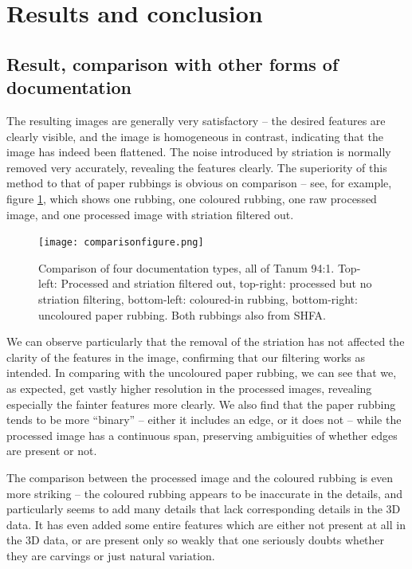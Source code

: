 \documentclass[a4paper,reqno,oneside]{amsart} %
\theoremstyle{definition}
\theoremstyle{remark}
\numberwithin{equation}{section}
\begin{document}
\section{Results and conclusion}

\subsection{Result, comparison with other forms of documentation}

The resulting images are generally very satisfactory -- the desired features are clearly visible, and the image is homogeneous in contrast, indicating that the image has indeed been flattened. The noise introduced by striation is normally removed very accurately, revealing the features clearly. The superiority of this method to that of paper rubbings is obvious on comparison -- see, for example, figure \ref{fig:comparison}, which shows one rubbing, one coloured rubbing, one raw processed image, and one processed image with striation filtered out.

\begin{figure}[!htb]
\centering
\texttt{[image: comparisonfigure.png]}
\caption{Comparison of four documentation types, all of Tanum 94:1.  Top-left: Processed and striation filtered out, top-right: processed but no striation filtering, bottom-left: coloured-in rubbing, bottom-right: uncoloured paper rubbing. Both rubbings also from SHFA.}
\label{fig:comparison}
\end{figure}

We can observe particularly that the removal of the striation has not affected the clarity of the features in the image, confirming that our filtering works as intended. In comparing with the uncoloured paper rubbing, we can see that we, as expected, get vastly higher resolution in the processed images, revealing especially the fainter features more clearly. We also find that the paper rubbing tends to be more ``binary'' -- either it includes an edge, or it does not -- while the processed image has a continuous span, preserving ambiguities of whether edges are present or not.

The comparison between the processed image and the coloured rubbing is even more striking -- the coloured rubbing appears to be inaccurate in the details, and particularly seems to add many details that lack corresponding details in the 3D data. It has even added some entire features which are either not present at all in the 3D data, or are present only so weakly that one seriously doubts whether they are carvings or just natural variation.
\end{document}
